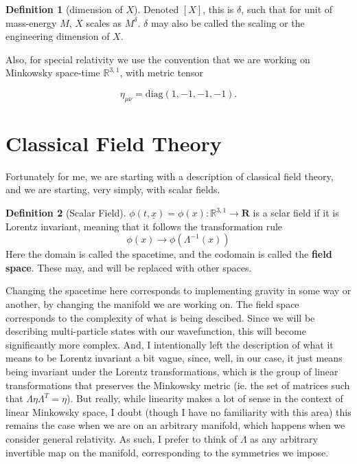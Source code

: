 \documentclass{article}
\theoremstyle{definition}
\newtheorem{definition}{Definition}
\begin{document}
\begin{definition}[dimension of $X$]
  Denoted $[X]$, this is $\delta$, such that for unit of mass-energy $M$, $X$
  scales as $M^\delta$. $\delta$ may also be called the scaling or the
  engineering dimension of $X$.
\end{definition}

Also, for special relativity we use the convention that we are working on
Minkowsky space-time $\mathbb{R}^{3, 1}$, with metric tensor

$$ \eta_{\mu \nu} = \text{diag}(1, -1, -1, -1). $$

\section{Classical Field Theory}

Fortunately for me, we are starting with a description of classical field
theory, and we are starting, very simply, with scalar fields.

\begin{definition}[Scalar Field]
  $\phi(t, \underline{x}) = \phi(x) : \mathbb{R}^{3, 1} \to \mathbf{R}$ is a sclar field
  if it is Lorentz invariant, meaning that it follows the transformation rule
  $$ \phi(x) \to \phi(\Lambda^{-1}(x)) $$
  Here the domain is called the spacetime, and the codomain is called the
  \textbf{field space}. These may, and will be replaced with other spaces.
\end{definition}

Changing the spacetime here corresponds to implementing gravity in some way or
another, by changing the manifold we are working on. The field space corresponds
to the complexity of what is being descibed. Since we will be describing
multi-particle states with our wavefunction, this will become significantly more
complex. And, I intentionally left the description of what it means to be
Lorentz invariant a bit vague, since, well, in our case, it just means being
invariant under the Lorentz transformations, which is the group of
linear transformations that preserves the Minkowsky metric (ie. the set of
matrices such that $\Lambda \eta \Lambda^T = \eta$). But really, while linearity
makes a lot of sense in the context of linear Minkowsky space, I doubt (though I
have no familiarity with this area) this remains the case when we are on an
arbitrary manifold, which happens when we consider general relativity. As such,
I prefer to think of $\Lambda$ as any arbitrary invertible map on the manifold,
corresponding to the symmetries we impose. 
\end{document}
